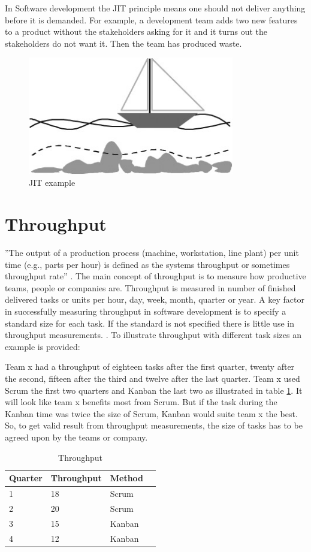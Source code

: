 \documentclass[UKenglish]{ifimaster}  %
\begin{document}
In Software development the JIT principle means one should not deliver anything before it is demanded. For example, a development team adds two new features to a product without the stakeholders asking for it and it turns out the stakeholders do not want it. Then the team has produced waste. 
\begin{figure}[ht!]
\centering
\includegraphics[width=90mm]{Picture/JIT.jpg}
\caption{JIT example}
\label{JITE} %
\end{figure}

\section{Throughput}
''The output of a production process (machine, workstation, line plant) per unit time (e.g., parts per hour) is defined as the systems throughput or sometimes throughput rate'' \parencite{Adams}.
The main concept of throughput is to measure how productive teams, people or companies are. Throughput is measured in number of finished delivered tasks or units per hour, day, week, month, quarter or year. A key factor in successfully measuring throughput in software development is to specify a standard size for each task. If the standard is not specified there is little use in throughput measurements.  \parencite{Throughput}. To illustrate throughput with different task sizes an example is provided:  

Team x had a throughput of eighteen tasks after the first quarter, twenty after the second, fifteen after the third and twelve after the last quarter. Team x used Scrum the first two quarters and Kanban the last two as illustrated in table \ref{tt}. It will look like team x benefits most from Scrum. But if the task during the Kanban time was twice the size of Scrum, Kanban would suite team x the best. So, to get valid result from throughput measurements, the size of tasks has to be agreed upon by the teams or company.
\begin{table}[ht]
\begin{center}
    \begin{tabular}{| l | l | l | l |}
    \hline
    Quarter & Throughput & Method\\ \hline
    1 & 18 & Scrum\\ \hline
    2 & 20 & Scrum \\ \hline
    3 & 15 & Kanban\\ \hline
    4 & 12 & Kanban\\ \hline
    \end{tabular}
\caption{Throughput}
\label{tt} %
\end{center}
\end{table}
\end{document}

